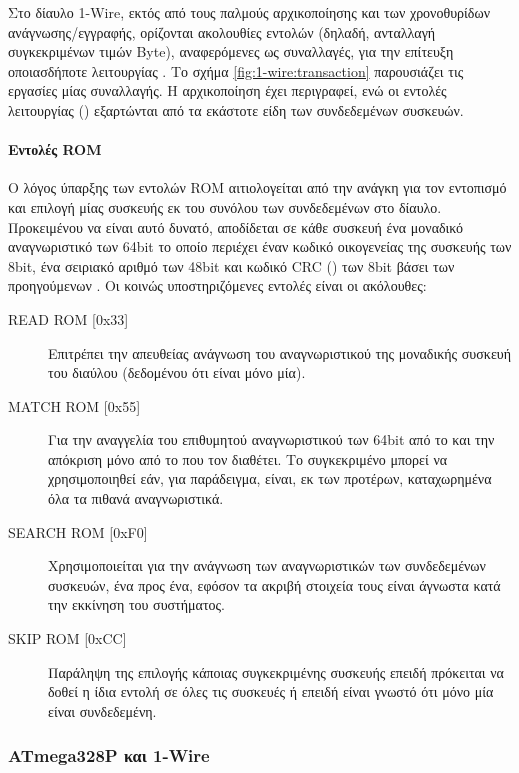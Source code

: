 Στο δίαυλο 1-Wire, εκτός από τους παλμούς αρχικοποίησης και των χρονοθυρίδων
ανάγνωσης\slash{}εγγραφής, ορίζονται ακολουθίες εντολών (δηλαδή, ανταλλαγή
συγκεκριμένων τιμών Byte), αναφερόμενες ως συναλλαγές, για την επίτευξη
οποιασδήποτε λειτουργίας \parencite[10]{ds18b20}. Το σχήμα
\ref{fig:1-wire:transaction} παρουσιάζει τις εργασίες μίας συναλλαγής.
Η αρχικοποίηση έχει περιγραφεί, ενώ οι εντολές λειτουργίας
() εξαρτώνται από τα εκάστοτε είδη των συνδεδεμένων
συσκευών.

\paragraph{Εντολές ROM}%
Ο λόγος ύπαρξης των εντολών ROM αιτιολογείται από την ανάγκη για τον εντοπισμό
και επιλογή μίας συσκευής  εκ του συνόλου των συνδεδεμένων στο δίαυλο.
Προκειμένου να είναι αυτό δυνατό, αποδίδεται σε κάθε συσκευή ένα μοναδικό
αναγνωριστικό των 64bit το οποίο περιέχει έναν κωδικό οικογενείας της συσκευής
των 8bit, ένα σειριακό αριθμό των 48bit και κωδικό CRC () των 8bit βάσει των προηγούμενων  \parencite[6]{ds18b20}.
Οι κοινώς υποστηριζόμενες εντολές  είναι οι ακόλουθες:
\begin{description}
    \item[READ ROM [0x33{]}] Επιτρέπει την απευθείας ανάγνωση του
    αναγνωριστικού της μοναδικής  συσκευή του διαύλου (δεδομένου ότι
    είναι μόνο μία).

    \item[MATCH ROM [0x55{]}] Για την αναγγελία του επιθυμητού αναγνωριστικού
    των 64bit από το  και την απόκριση μόνο από το  που τον
    διαθέτει. Το συγκεκριμένο μπορεί να χρησιμοποιηθεί εάν, για παράδειγμα,
    είναι, εκ των προτέρων, καταχωρημένα όλα τα πιθανά αναγνωριστικά.

    \item[SEARCH ROM [0xF0{]}] Χρησιμοποιείται για την ανάγνωση των
    αναγνωριστικών των συνδεδεμένων συσκευών, ένα προς ένα, εφόσον τα ακριβή
    στοιχεία τους είναι άγνωστα κατά την εκκίνηση του συστήματος.

    \item[SKIP ROM [0xCC{]}] Παράληψη της επιλογής κάποιας συγκεκριμένης
    συσκευής επειδή πρόκειται να δοθεί η ίδια εντολή σε όλες τις συσκευές ή
    επειδή είναι γνωστό ότι μόνο μία είναι συνδεδεμένη.
\end{description}


\subsubsection{ATmega328P και 1-Wire}

